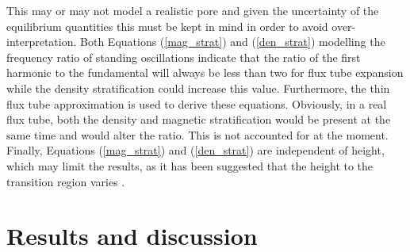     This may or may not model a realistic pore and given the uncertainty of the equilibrium quantities this must be kept in mind in order to avoid over-interpretation.
    Both Equations (\ref{mag_strat}) and (\ref{den_strat}) modelling the frequency ratio of standing oscillations indicate that the ratio of the first harmonic to the fundamental will always be less than two for flux tube expansion while the density stratification could increase this value.
    Furthermore, the thin flux tube approximation is used to derive these equations.
    Obviously, in a real flux tube, both the density and magnetic stratification would be present at the same time and would alter the ratio.
    This is not accounted for at the moment.
    Finally, Equations (\ref{mag_strat}) and (\ref{den_strat}) are independent of height, which may limit the results, as it has been suggested that the height to the transition region varies \citep{tian2009solar}.	
    
\section{Results and discussion}
\label{res}

